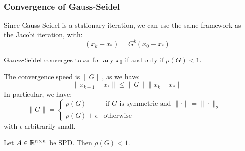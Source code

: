 \documentclass[../main/main.tex]{subfiles}
\begin{document}
\subsubsection{Convergence of Gauss-Seidel}
Since Gauss-Seidel is a stationary iteration, we can use the same framework as the Jacobi iteration, with: \[
(x_{k}-x_{*}) = G^{k}(x_{0}-x_{*})
\]
\begin{theorem}
Gauss-Seidel converges to $x_{*}$ for any $x_{0}$ if and only if $\rho(G)<1$.
\end{theorem}
The convergence speed is $\|G\|$, as we have: \[
\|x_{k+1}-x_{*}\| \leq \|G\|\|x_{k}-x_{*}\|
\] In particular, we have:  \[
\|G\| = \begin{cases}
  \rho(G) & \text{ if $G$ is symmetric and $\|\cdot\|=\|\cdot\|_{2}$ }\\
  \rho(G)+\epsilon & \text{otherwise}
\end{cases}
\]with $\epsilon$ arbitrarily small.
\begin{theorem}
Let $A \in\mathbb{R}^{n \times n}$ be SPD. Then $\rho(G)< 1$.
\end{theorem}
\end{document}

